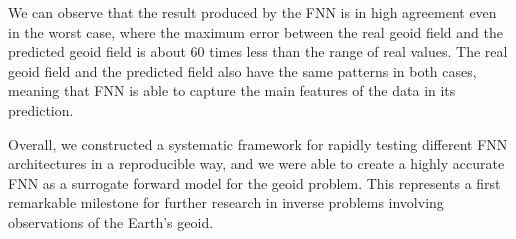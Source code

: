We can observe that the result produced by the FNN is in high agreement even in the worst case, where the maximum error between the real geoid field and the predicted geoid field is about 60 times less than the range of real values. The real geoid field and the predicted field also have the same patterns in both cases, meaning that FNN is able to capture the main features of the data in its prediction.

Overall, we constructed a systematic framework for rapidly testing different FNN architectures in a reproducible way, and we were able to create a highly accurate FNN as a surrogate forward model for the geoid problem. This represents a first remarkable milestone for further research in inverse problems involving observations of the Earth's geoid.